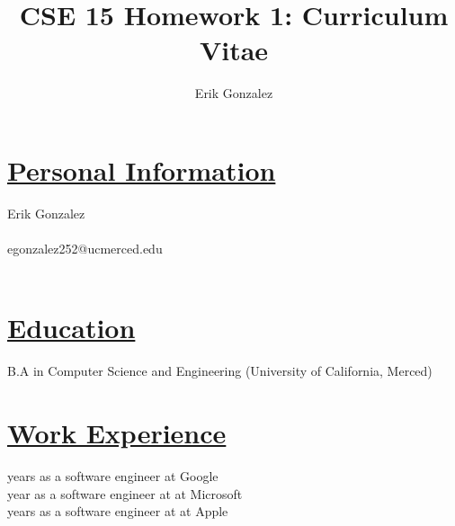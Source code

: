 \documentclass{article}
\title{CSE 15 Homework 1: Curriculum Vitae}
\author{Erik Gonzalez}
\begin{document}
\maketitle

\section*{\centering \underline{Personal Information}}
\centering Erik Gonzalez\\\\
\centering egonzalez252@ucmerced.edu\\\

\section*{\centering \underline{Education}}
\centering B.A in Computer Science and Engineering (University of California, Merced)\\

\section*{\centering \underline{Work Experience}}
 years as a software engineer at Google\\
 year as a software engineer at at Microsoft\\
 years as a software engineer at at Apple\\
\end{document}
